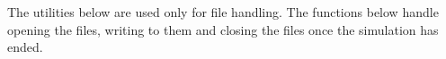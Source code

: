The utilities below are used only for file handling. The functions below handle opening the files, writing to them and closing the files once the simulation has ended.
